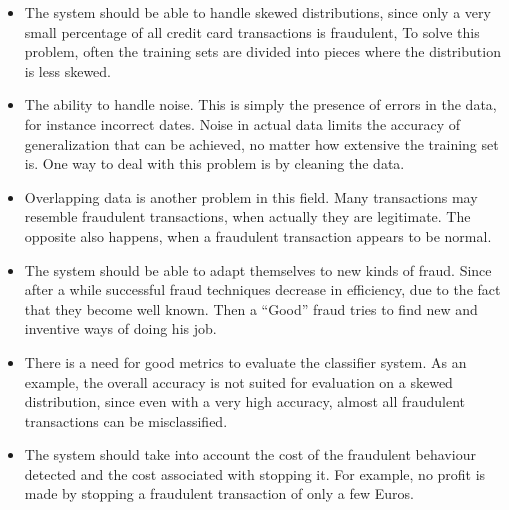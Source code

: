 \documentclass{report}
\begin{document}
\begin{itemize}
  \item The system should be able to handle skewed distributions, since only a very small percentage of all credit card transactions is fraudulent, To solve this problem, often the training sets are divided into pieces where the distribution is less skewed.

  \item The ability to handle noise. This is simply the presence of errors in the data, for instance incorrect dates. Noise in actual data limits the accuracy of generalization that can be achieved, no matter how extensive the training set is. One way to deal with this problem is by cleaning the data. 
  
  \item Overlapping data is another problem in this field. Many transactions may resemble fraudulent transactions, when actually they are legitimate. The opposite also happens, when a fraudulent transaction appears to be normal. 


\item The system should be able to adapt themselves to new kinds of fraud. Since after a while successful fraud techniques decrease in efficiency, due to the fact that they become well known. Then a “Good” fraud tries to find new and inventive ways of doing his job.

\item There is a need for good metrics to evaluate the classifier system. As an example, the overall accuracy is not suited for evaluation on a skewed distribution, since even with a very high accuracy, almost all fraudulent transactions can be misclassified. 

\item The system should take into account the cost of the fraudulent behaviour detected and the cost associated with stopping it. For example, no profit is made by stopping a fraudulent transaction of only a few Euros. 


\end{itemize}
\end{document}
